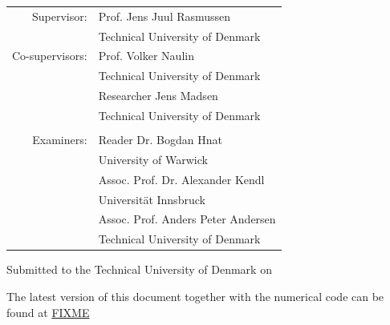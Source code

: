 \begin{titlepage}
\begin{center}
        \large
        {\def\arraystretch{1}\tabcolsep=10pt
        \begin{tabular}{rl}
        Supervisor:     & Prof. Jens Juul Rasmussen          \\ & Technical University of Denmark\\
        Co-supervisors: & Prof. Volker Naulin                \\ & Technical University of Denmark\\
                        & Researcher Jens Madsen             \\ & Technical University of Denmark\\
        &\\
        Examiners:      & Reader Dr.  Bogdan Hnat            \\ & University of Warwick\\
                        & Assoc. Prof. Dr.  Alexander Kendl  \\ & Universit{\"a}t Innsbruck\\
                        & Assoc. Prof. Anders Peter Andersen \\ & Technical University of Denmark\\
        \end{tabular}
        }

        \vfill

        Submitted to the Technical University of Denmark on \thesisDate

        \vfill
        The latest version of this document together with the numerical code can be found at \href{FIXME}{FIXME}
    \end{center}
\end{titlepage}
